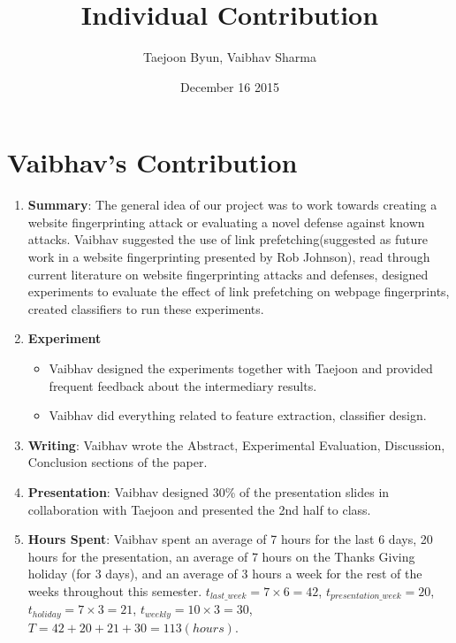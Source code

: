 \documentclass{article}
\title{Individual Contribution}
\author{Taejoon Byun, Vaibhav Sharma}
\date{December 16 2015}
\begin{document}
\section{Vaibhav's Contribution}
\begin{enumerate}
\item
{\bf Summary}:
The general idea of our project was to work towards creating a website fingerprinting attack or evaluating a novel defense against known attacks. 
Vaibhav suggested the use of link prefetching(suggested as future work in a website fingerprinting presented by Rob Johnson), read through current literature on website fingerprinting attacks and defenses, designed experiments to evaluate the effect of link prefetching on webpage fingerprints, created classifiers to run these experiments.
\item
{\bf Experiment}
\begin{itemize}
\item
Vaibhav designed the experiments together with Taejoon and provided frequent feedback about the intermediary results.
\item
Vaibhav did everything related to feature extraction, classifier design.
\end{itemize}
\item
{\bf Writing}: Vaibhav wrote the Abstract, Experimental Evaluation, Discussion, Conclusion sections of the paper.
\item
{\bf Presentation}: Vaibhav designed 30\% of the presentation slides in collaboration with Taejoon and presented the 2nd half to class.
\item
{\bf Hours Spent}: Vaibhav spent an average of 7 hours for the last 6 days, 20 hours for the presentation, an average of 7 hours on the Thanks Giving holiday (for 3 days), and an average of 3 hours a week for the rest of the weeks throughout this semester.
$t_{\mathit{last\_week}} = 7 \times 6 = 42$,
$t_{\mathit{presentation\_week}} = 20$,
$t_{\mathit{holiday}} = 7 \times 3 = 21$,
$t_{\mathit{weekly}} = 10 \times 3 = 30$,
$T = 42 + 20 + 21 + 30 = 113 (hours)$.
\end{enumerate}
\end{document}
